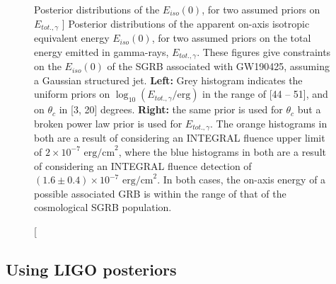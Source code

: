     \begin{figure}[H]
        \begin{subfigure}{0.5\textwidth}
              \label{fig:unif}
              \centering
              \def\svgwidth{\textwidth}
              
        \end{subfigure}%
        \begin{subfigure}{0.5\textwidth}
              \label{fig:bpl}
              \centering
              \def\svgwidth{\textwidth}
              
        \end{subfigure}
        \caption
        [
            Posterior distributions of the $E_{iso}(0)$, for two assumed priors
            on $E_{tot., \gamma}$
        ]
        {
            Posterior distributions of the apparent on-axis isotropic equivalent energy
            $E_{iso}(0)$, for two assumed priors on the total energy emitted in
            gamma-rays, $E_{tot., \gamma}$. These figures give constraints on the
            $E_{iso}(0)$ of the SGRB associated with GW190425, assuming a Gaussian
            structured jet. \textbf{Left:} Grey histogram indicates the uniform priors
            on $\log_{10}(E_{tot., \gamma}/\mathrm{erg})$ in the range of [44 -- 51],
            and on $\theta_c$ in [3, 20] degrees. \textbf{Right:} the same prior is
            used for $\theta_c$ but a broken power law prior is used for $E_{tot.,
            \gamma}$. The orange histograms in both are a result of considering an
            INTEGRAL fluence upper limit of $2 \times 10^{-7} \text{ erg/cm}^2$, where
            the blue histograms in both are a result of considering an INTEGRAL fluence
            detection of $(1.6 \pm 0.4) \times 10^{-7} \text{ erg/cm}^2$. In both cases,
            the on-axis energy of a possible associated GRB is within the range of that
            of the cosmological SGRB population.
        }
        \label{fig:unif_bpl}
    \end{figure}


    \subsection{Using LIGO posteriors}

